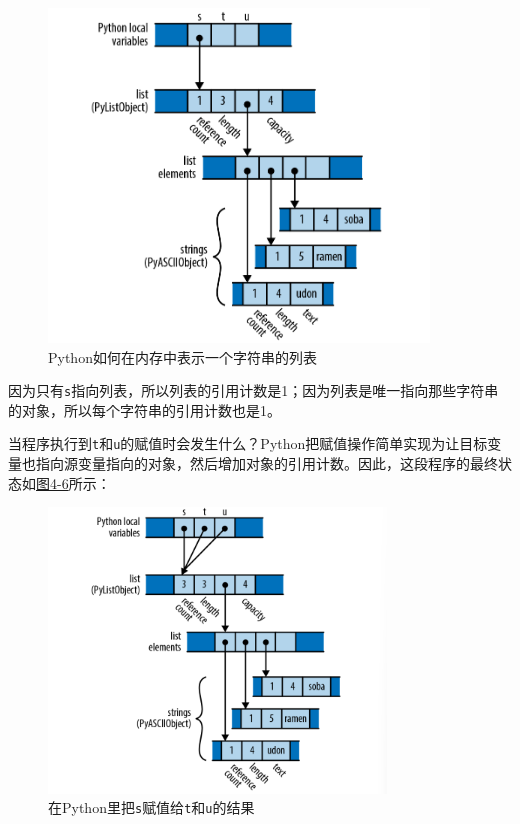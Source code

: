 \begin{figure}[htbp]
    \centering
    \includegraphics[width=0.9\textwidth]{../img/f4-5.png}
    \caption{Python如何在内存中表示一个字符串的列表}
    \label{f4-5}
\end{figure}

因为只有\texttt{s}指向列表，所以列表的引用计数是1；因为列表是唯一指向那些字符串的对象，所以每个字符串的引用计数也是1。

当程序执行到\texttt{t}和\texttt{u}的赋值时会发生什么？Python把赋值操作简单实现为让目标变量也指向源变量指向的对象，然后增加对象的引用计数。因此，这段程序的最终状态如\hyperref[f4-6]{图4-6}所示：
\begin{figure}[htbp]
    \centering
    \includegraphics[width=0.8\textwidth]{../img/f4-6.png}
    \caption{在Python里把\texttt{s}赋值给\texttt{t}和\texttt{u}的结果}
    \label{f4-6}
\end{figure}


